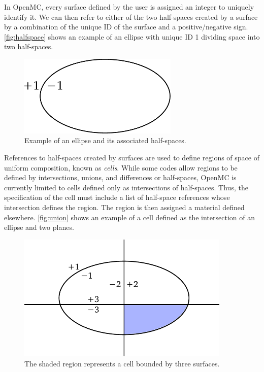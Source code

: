In OpenMC, every surface defined by the user is assigned an integer to uniquely
identify it. We can then refer to either of the two half-spaces created by a
surface by a combination of the unique ID of the surface and a positive/negative
sign. \autoref{fig:halfspace} shows an example of an ellipse with unique ID 1
dividing space into two half-spaces.
\begin{figure}[htb]
  \centering
  \includegraphics[width=3.0in]{figures/ch2/halfspace.pdf}
  \caption{Example of an ellipse and its associated half-spaces.}
  \label{fig:halfspace}
\end{figure}

References to half-spaces created by surfaces are used to define regions of
space of uniform composition, known as \emph{cells}. While some codes allow
regions to be defined by intersections, unions, and differences or half-spaces,
OpenMC is currently limited to cells defined only as intersections of
half-spaces. Thus, the specification of the cell must include a list of
half-space references whose intersection defines the region. The region is then
assigned a material defined elsewhere. \autoref{fig:union} shows an example of a
cell defined as the intersection of an ellipse and two planes.
\begin{figure}[htb]
  \centering
  \includegraphics[width=4.0in]{figures/ch2/union.pdf}
  \caption{The shaded region represents a cell bounded by three surfaces.}
  \label{fig:union}
\end{figure}

